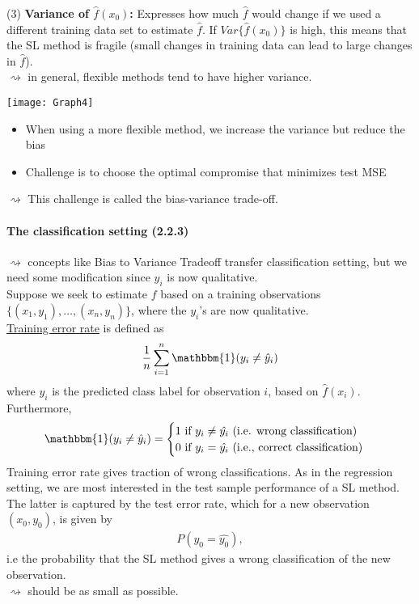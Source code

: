 \documentclass[11pt,a4paper,numbers=endperiod]{scrartcl}
\begin{document}
(3) \textbf{Variance of $\hat{f}(x_0)$:} Expresses how much $\hat{f}$ would change if we used a different training data set to estimate $\hat{f}$. If $Var \{\hat{f}(x_0)\}$ is high, this means that the SL method is fragile (small changes in training data can lead to large changes in $\hat{f}$).\\
$\rightsquigarrow$ in general, flexible methods tend to have higher variance. \\
\begin{center}
	\texttt{[image: Graph4]}
\end{center}

\begin{itemize}[label={--}]
	\item When using a more flexible method, we increase the variance but reduce the bias
	\item Challenge is to choose the optimal compromise that minimizes test MSE
\end{itemize}
$\rightsquigarrow$ This challenge is called the bias-variance trade-off. 
\newpage
\paragraph{The classification setting (2.2.3)}
$ $\\

$\rightsquigarrow$ concepts like Bias to Variance Tradeoff transfer classification setting, but we need some modification since $y_i$ is now qualitative.\\

Suppose we seek to estimate $f$ based on a training observations $\{(x_1, y_1), \ldots, (x_n, y_n)\}$, where the $y_i$'s are now qualitative.\\
\underline{Training error rate} is defined as 
\begin{align*}
	\frac{1}{n} \sum\limits_{i =1}^n \mathbbm{1}(y_i \neq \hat{y}_i)
\end{align*}
where $\hat{y_i}$ is the predicted class label for observation $i$, based on $\hat{f}(x_i)$. Furthermore, 
\begin{align*}
	\mathbbm{1}(y_i \neq \hat{y}_i) = \begin{cases}
		1 \text{ if } y_i \neq \hat{y_i} \text{  (i.e. wrong classification)}\\
		0 \text{ if } y_i = \hat{y_i} \text{ (i.e., correct classification)}
		\end{cases}
\end{align*}
Training error rate gives traction of wrong classifications. As in the regression setting, we are most interested in the test sample performance of a SL method. The latter is captured by the test error rate, which for a new observation $(x_0, y_0)$, is given by
\begin{align*}
	P(y_0 = \hat{y_0}), 
\end{align*}
i.e the probability that the SL method gives a wrong classification of the new observation.\\ $\rightsquigarrow$ should be as small as possible. 
\newpage
\end{document}

